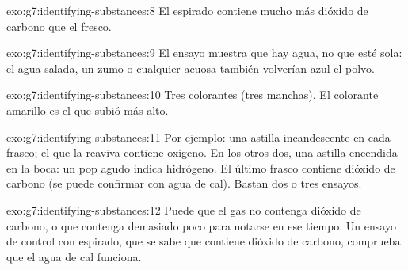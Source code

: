 \begin{solution}{exo:g7:identifying-substances:8}
El  espirado contiene mucho más dióxido de carbono que el 
fresco.
\end{solution}

\begin{solution}{exo:g7:identifying-substances:9}
El ensayo muestra que hay agua, no que esté sola: el agua salada, un
zumo o cualquier  acuosa también volverían azul el polvo.
\end{solution}

\begin{solution}{exo:g7:identifying-substances:10}
Tres colorantes (tres manchas). El colorante amarillo es el que subió
más alto.
\end{solution}

\begin{solution}{exo:g7:identifying-substances:11}
Por ejemplo: una astilla incandescente en cada frasco; el que la reaviva
contiene oxígeno. En los otros dos, una astilla encendida en la boca: un
pop agudo indica hidrógeno. El último frasco contiene dióxido de carbono
(se puede confirmar con agua de cal). Bastan dos o tres ensayos.
\end{solution}

\begin{solution}{exo:g7:identifying-substances:12}
Puede que el gas no contenga dióxido de carbono, o que contenga
demasiado poco para notarse en ese tiempo. Un ensayo de control con 
espirado, que se sabe que contiene dióxido de carbono, comprueba que el
agua de cal funciona.
\end{solution}

